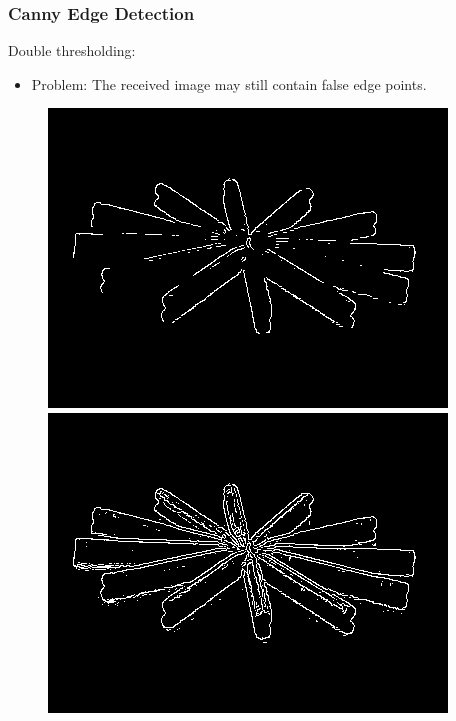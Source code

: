 \documentclass[notheorems,serif,table,compress]{beamer}  %
\begin{document}
\begin{frame}
\frametitle{Canny Edge Detection}
{\color{blue}Double thresholding:}
    \begin{itemize}
        \item {\color{blue}Problem:} The received image may still contain false edge points.
    \end{itemize}
        \begin{figure}
            \begin{minipage}[t]{0.35\linewidth}
                \includegraphics[width=1\linewidth]{height.png} 
            \end{minipage}
            \begin{minipage}[t]{0.35\linewidth}
                \includegraphics[width=1\linewidth]{low.png} 

\end{minipage}
\end{figure}
\end{frame}
\end{document}
